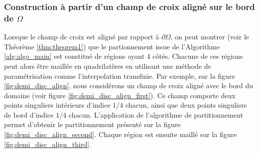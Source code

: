 \subsubsection*{Construction à partir d'un champ de croix aligné sur le bord de $\Omega$}

Lorsque le champ de croix est aligné par rapport à $\partial\Omega$, on peut montrer (voir le Théorème \ref{thm:theorem1}) que le partionnement issue de l'Algorithme \ref{alg:algo_main} est constitué de régions ayant 4 côtés. Chacune de ces régions peut alors être maillée en quadrilatères en utilisant une méthode de paramétrisation comme l'interpolation transfinie. Par exemple, sur la figure \ref{fig:demi_disc_align}, nous considérons un champ de croix aligné avec le bord du domaine (voir figure \ref{fig:demi_disc_align_first}). Ce champ comporte deux points singuliers intérieurs d'indice $1/4$ chacun, ainsi que deux points singuliers de bord d'indice $1/4$ chacun. L'application de l'algorithme de partitionnement permet d'obtenir le partitionnement présenté sur la figure \ref{fig:demi_disc_align_second}. Chaque région est ensuite maillé sur la figure \ref{fig:demi_disc_align_third}.

